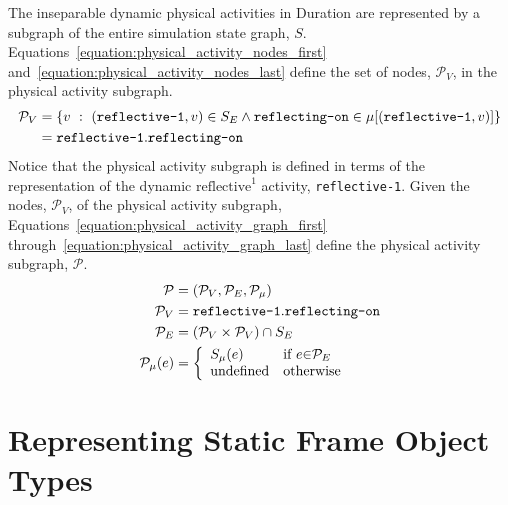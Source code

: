 The inseparable dynamic physical activities in Duration are
represented by a subgraph of the entire simulation state graph, $S$.
{\mbox{Equations~\ref{equation:physical_activity_nodes_first}}}
{\mbox{and~\ref{equation:physical_activity_nodes_last}}} define the
set of nodes, $\mathcal{P}_V$, in the physical activity subgraph.
\begin{align}
\label{equation:physical_activity_nodes_first}
  \mathcal{P}_V &= \{v ~:~ (\text{\tt{reflective-1}}, v) \in S_E \wedge \text{\tt{reflecting-on}} \in \mu[(\text{\tt{reflective-1}}, v)]\} \\
\label{equation:physical_activity_nodes_last}
                &= \text{\tt{reflective-1}}.\text{\tt{reflecting-on}}
\end{align}
Notice that the physical activity subgraph is defined in terms of the
representation of the dynamic $\text{reflective}^1$ activity,
{\tt{reflective-1}}.  Given the nodes, $\mathcal{P}_V$, of the
physical activity subgraph,
{\mbox{Equations~\ref{equation:physical_activity_graph_first}}}
{\mbox{through~\ref{equation:physical_activity_graph_last}}} define
the physical activity subgraph, $\mathcal{P}$.
\begin{align}
\label{equation:physical_activity_graph_first}
                        \mathcal{P} &= (\mathcal{P}_V, \mathcal{P}_E, \mathcal{P}_\mu) \\
                      \mathcal{P}_V &= \text{\tt{reflective-1}}.\text{\tt{reflecting-on}} \\
                      \mathcal{P}_E &= (\mathcal{P}_V \times \mathcal{P}_V) \cap S_E \\
\label{equation:physical_activity_graph_last}
\mathcal{P}_\mu(e) &=
   {\left\{
      \begin{array}{ll}
        S_\mu(e) & \text{if }e {\in} \mathcal{P}_E \\
        \text{undefined}          & \text{otherwise}
      \end{array}
    \right.}
\end{align}

\section{Representing Static Frame Object Types}

